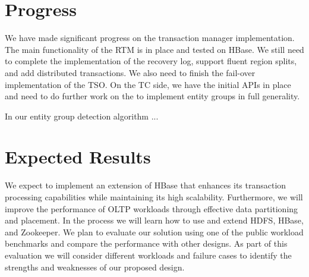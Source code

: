 \documentclass[10pt,final,journal]{IEEEtran}
\begin{document}
\section{Progress}
We have made significant progress on the transaction manager implementation. The main functionality of the RTM is in place and tested on HBase. We still need to complete the implementation of the recovery log, support fluent region splits, and add distributed transactions. We also need to finish the fail-over implementation of the TSO. On the TC side, we have the initial APIs in place and need to do further work on the  to implement entity groups in full generality.

In our entity group detection algorithm ...

\section{Expected Results}
We expect to implement an extension of HBase that enhances its transaction processing capabilities while maintaining its high scalability. Furthermore, we will improve the performance of OLTP workloads through effective data partitioning and placement. In the process we will learn how to use and extend HDFS, HBase, and Zookeeper. We plan to evaluate our solution using one of the public workload benchmarks and compare the performance with other designs. As part of this evaluation we will consider different workloads and failure cases to identify the strengths and weaknesses of our proposed design.



\end{document}

